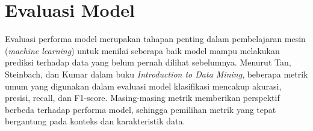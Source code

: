 \section{Evaluasi Model}\label{sec:evaluasi_model}

Evaluasi performa model merupakan tahapan penting dalam pembelajaran mesin (\textit{machine learning}) untuk menilai seberapa baik model mampu melakukan prediksi terhadap data yang belum pernah dilihat sebelumnya. Menurut Tan, Steinbach, dan Kumar  \cite{tan2019introduction} dalam buku \textit{Introduction to Data Mining}, beberapa metrik umum yang digunakan dalam evaluasi model klasifikasi mencakup akurasi, presisi, recall, dan F1-score. Masing-masing metrik memberikan perspektif berbeda terhadap performa model, sehingga pemilihan metrik yang tepat bergantung pada konteks dan karakteristik data.
    
